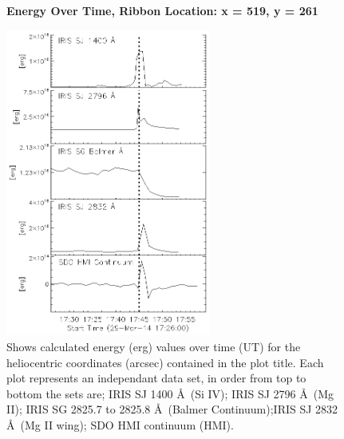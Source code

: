 \begin{figure}[H]
  \begin{center}
  \textbf{Energy Over Time, Ribbon Location: x = 519, y = 261 }\par\medskip
  \includegraphics[width=0.6\textwidth]{29-Mar-14-Ribbon-xyPosition-519-261-Frame-1-Energy-Ladder}
  \end{center}
  \caption{Shows calculated energy (erg) values over time (UT) for the heliocentric coordinates (arcsec) contained in the plot title. Each plot represents an independant data set, in order from top to bottom the sets are; IRIS SJ 1400 \AA\ (Si IV); IRIS SJ 2796 \AA\ (Mg II); IRIS SG  2825.7 to 2825.8 \AA\ (Balmer Continuum);IRIS SJ 2832 \AA\ (Mg II wing); SDO HMI continuum (HMI).}\label{erb3}
\end{figure}


